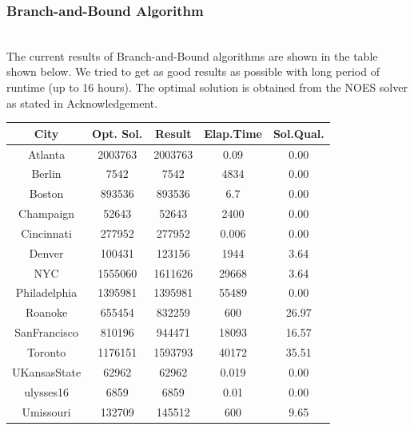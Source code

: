 \subsubsection{Branch-and-Bound Algorithm}
\hfill\\
The current results of Branch-and-Bound algorithms are shown in the table shown below. We tried to get as good results as possible with long period of runtime (up to 16 hours). The optimal solution is obtained from the NOES solver as stated in Acknowledgement.\\
\begin{center}
\begin{tabular}{ |c|c|c|c|c| }
\hline
City         & Opt. Sol. & Result  & Elap.Time & Sol.Qual. \\
\hline
Atlanta      & 2003763   & 2003763 & 0.09      & 0.00      \\
Berlin       & 7542      & 7542    & 4834      & 0.00      \\
Boston       & 893536    & 893536  & 6.7       & 0.00      \\
Champaign    & 52643     & 52643   & 2400      & 0.00      \\
Cincinnati   & 277952    & 277952  & 0.006     & 0.00      \\
Denver       & 100431    & 123156  & 1944      & 3.64      \\
NYC          & 1555060   & 1611626 & 29668     & 3.64      \\
Philadelphia & 1395981   & 1395981 & 55489     & 0.00      \\
Roanoke      & 655454    & 832259  & 600       & 26.97     \\
SanFrancisco & 810196    & 944471  & 18093     & 16.57     \\
Toronto      & 1176151   & 1593793 & 40172     & 35.51     \\
UKansasState & 62962     & 62962   & 0.019     & 0.00      \\
ulysses16    & 6859      & 6859    & 0.01      & 0.00      \\
Umissouri    & 132709    & 145512  & 600       & 9.65      \\ 
\hline


\end{tabular}
\end{center}
